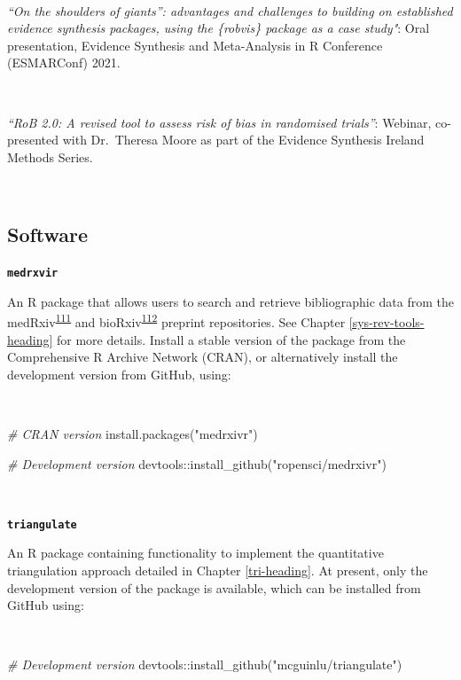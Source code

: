 \documentclass[a4paper, twoside]{templates/ociamthesis}
\newenvironment{Shaded}{\begin{snugshade}}{\end{snugshade}}
\newcommand{\CommentTok}[1]{\textcolor[rgb]{0.56,0.35,0.01}{\textit{#1}}}
\newcommand{\FunctionTok}[1]{\textcolor[rgb]{0.00,0.00,0.00}{#1}}
\newcommand{\NormalTok}[1]{#1}
\newcommand{\SpecialCharTok}[1]{\textcolor[rgb]{0.00,0.00,0.00}{#1}}
\newcommand{\StringTok}[1]{\textcolor[rgb]{0.31,0.60,0.02}{#1}}
\renewenvironment{Shaded}
{
  \vspace{4pt}%
  \begin{snugshade}%
}{%
  \end{snugshade}%
  \vspace{4pt}%
}
\begin{document}
~

\emph{``On the shoulders of giants'': advantages and challenges to building on established evidence synthesis packages, using the \{robvis\} package as a case study"}: Oral presentation, Evidence Synthesis and Meta-Analysis in R Conference (ESMARConf) 2021.

~

\emph{``RoB 2.0: A revised tool to assess risk of bias in randomised trials''}: Webinar, co-presented with Dr.~Theresa Moore as part of the Evidence Synthesis Ireland Methods Series.

~

\hypertarget{outputs-software}{%
\subsection{Software}\label{outputs-software}}

\textbf{\texttt{medrxvir}}

An R package that allows users to search and retrieve bibliographic data from the medRxiv\textsuperscript{\protect\hyperlink{ref-rawlinson2019}{111}} and bioRxiv\textsuperscript{\protect\hyperlink{ref-sever2019}{112}} preprint repositories. See Chapter \ref{sys-rev-tools-heading} for more details. Install a stable version of the package from the Comprehensive R Archive Network (CRAN), or alternatively install the development version from GitHub, using:

~
~

\begin{Shaded}
\begin{Highlighting}[]
\CommentTok{\# CRAN version}
\FunctionTok{install.packages}\NormalTok{(}\StringTok{"medrxivr"}\NormalTok{)}

\CommentTok{\# Development version}
\NormalTok{devtools}\SpecialCharTok{::}\FunctionTok{install\_github}\NormalTok{(}\StringTok{"ropensci/medrxivr"}\NormalTok{)}
\end{Highlighting}
\end{Shaded}

~

\textbf{\texttt{triangulate}}

An R package containing functionality to implement the quantitative triangulation approach detailed in Chapter \ref{tri-heading}. At present, only the development version of the package is available, which can be installed from GitHub using:

~

\begin{Shaded}
\begin{Highlighting}[]
\CommentTok{\# Development version}
\NormalTok{devtools}\SpecialCharTok{::}\FunctionTok{install\_github}\NormalTok{(}\StringTok{"mcguinlu/triangulate"}\NormalTok{)}
\end{Highlighting}
\end{Shaded}
\end{document}
